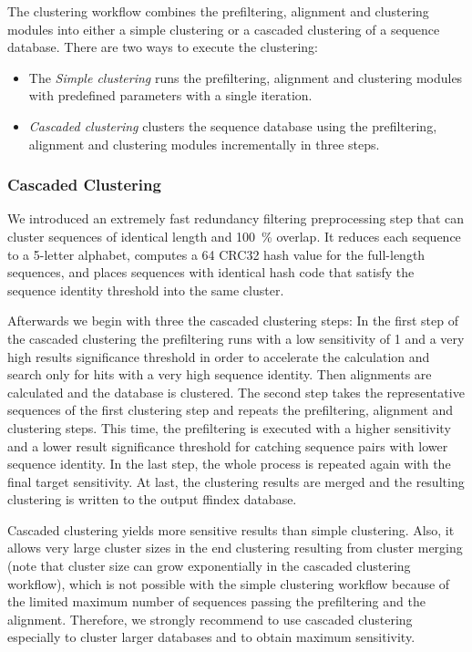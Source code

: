 \documentclass[11pt,a4paper]{scrreprt}
\begin{document}
The clustering workflow combines the prefiltering, alignment and clustering modules into either a simple clustering or a cascaded clustering of a sequence database. There are two ways to execute the clustering:


\begin{itemize}
\item The \emph{Simple clustering} runs the prefiltering, alignment and clustering
modules with predefined parameters with a single iteration.
\item \emph{Cascaded clustering} clusters the sequence database using the prefiltering, alignment and clustering modules incrementally in three steps.
\end{itemize}
\subsubsection{Cascaded Clustering}
We introduced an extremely fast redundancy filtering preprocessing step that can cluster sequences of identical length and \SI{100}{\percent} overlap. It reduces each sequence to a \num{5}-letter alphabet, computes a \SI{64}{\bit} CRC32 hash value for the full-length sequences, and places sequences with identical hash code that satisfy the sequence identity threshold into the same cluster.


Afterwards we begin with three the cascaded clustering steps: In the first step of the cascaded clustering the prefiltering runs with a low sensitivity of 1 and a very high results significance threshold in order to accelerate the calculation and search only for hits with a very high sequence identity. Then alignments are calculated and the database is clustered. The second step takes the representative sequences of the first clustering step and repeats the prefiltering, alignment and clustering steps. This time, the prefiltering is executed with a higher sensitivity and a lower result significance threshold for catching sequence pairs with lower sequence identity. In the last step, the whole process is repeated again with the final target sensitivity. At last, the clustering results are merged and the resulting clustering is written to the output ffindex database. 


Cascaded clustering yields more sensitive results than simple clustering. Also, it allows very large cluster sizes in the end clustering resulting from cluster merging (note that cluster size can grow exponentially in the cascaded clustering workflow), which is not possible with the simple clustering workflow because of the limited maximum number of sequences passing the prefiltering and the alignment. Therefore, we strongly recommend to use cascaded clustering especially to cluster larger databases and to obtain maximum sensitivity.
\end{document}
